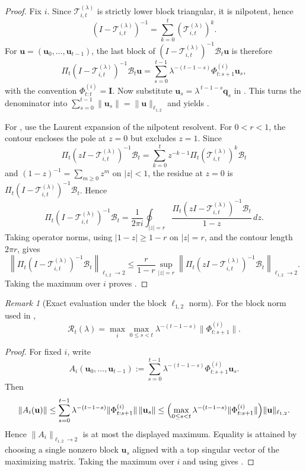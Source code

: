 \documentclass{article}
\theoremstyle{remark}
\newtheorem{remark}[theorem]{Remark}
\begin{document}
\begin{proof}
Fix $i$. Since $\mathcal{T}_{i,t}^{(\lambda)}$ is strictly lower block
triangular, it is nilpotent, hence
\[
  (I-\mathcal{T}_{i,t}^{(\lambda)})^{-1}
  = \sum_{k=0}^{t} (\mathcal{T}_{i,t}^{(\lambda)})^k.
\]
For $\mathbf{u}=(\mathbf{u}_0,\dots,\mathbf{u}_{t-1})$, the last block of
$(I-\mathcal{T}_{i,t}^{(\lambda)})^{-1}\mathcal{B}_t\mathbf{u}$ is therefore
\[
  \Pi_t (I-\mathcal{T}_{i,t}^{(\lambda)})^{-1}\mathcal{B}_t\mathbf{u}
  = \sum_{s=0}^{t-1}
    \lambda^{-(t-1-s)}\Phi_{t:s+1}^{(i)}\mathbf{u}_s,
\]
with the convention $\Phi_{t:t}^{(i)}=\mathbf{I}$.
Now substitute $\mathbf{u}_s = \lambda^{\,t-1-s}\mathbf{q}_s$ in
. This turns the denominator into
$\sum_{s=0}^{t-1}\|\mathbf{u}_s\| = \|\mathbf{u}\|_{\ell_{1,2}}$ and yields
.

For , use the Laurent expansion of the
nilpotent resolvent. For $0<r<1$, the contour encloses the pole at $z=0$ but
excludes $z=1$. Since
\[
  \Pi_t(zI-\mathcal{T}_{i,t}^{(\lambda)})^{-1}\mathcal{B}_t
  =
  \sum_{k=0}^{t} z^{-k-1}
  \Pi_t(\mathcal{T}_{i,t}^{(\lambda)})^k\mathcal{B}_t
\]
and $(1-z)^{-1}=\sum_{m\geq0}z^m$ on $|z|<1$, the residue at $z=0$ is
\(\Pi_t(I-\mathcal{T}_{i,t}^{(\lambda)})^{-1}\mathcal{B}_t\). Hence
\[
  \Pi_t(I-\mathcal{T}_{i,t}^{(\lambda)})^{-1}\mathcal{B}_t
  =
  \frac{1}{2\pi i}
  \oint_{|z|=r}
  \frac{\Pi_t(zI-\mathcal{T}_{i,t}^{(\lambda)})^{-1}\mathcal{B}_t}{1-z}\,dz.
\]
Taking operator norms, using $|1-z|\ge 1-r$ on $|z|=r$, and the contour length
$2\pi r$, gives
\[
  \left\|
    \Pi_t(I-\mathcal{T}_{i,t}^{(\lambda)})^{-1}\mathcal{B}_t
  \right\|_{\ell_{1,2}\to 2}
  \le
  \frac{r}{1-r}
  \sup_{|z|=r}
  \left\|
    \Pi_t(zI-\mathcal{T}_{i,t}^{(\lambda)})^{-1}\mathcal{B}_t
  \right\|_{\ell_{1,2}\to 2}.
\]
Taking the maximum over $i$ proves .
\end{proof}

\begin{remark}[Exact evaluation under the block $\ell_{1,2}$ norm]
\label{rem:cocycle_exact_eval}
For the block norm used in ,
\begin{equation}
  \mathcal{R}_t(\lambda)
  = \max_i \max_{0 \le s < t}
    \lambda^{-(t-1-s)}\|\Phi_{t:s+1}^{(i)}\|.
  \label{eq:cocycle_exact_eval}
\end{equation}
\end{remark}

\begin{proof}
For fixed $i$, write
\[
  A_i(\mathbf{u}_0,\dots,\mathbf{u}_{t-1})
  := \sum_{s=0}^{t-1}\lambda^{-(t-1-s)}\Phi_{t:s+1}^{(i)}\mathbf{u}_s.
\]
Then
\[
  \|A_i(\mathbf{u})\|
  \le \sum_{s=0}^{t-1}
      \lambda^{-(t-1-s)}\|\Phi_{t:s+1}^{(i)}\|\,\|\mathbf{u}_s\|
  \le
  \Bigl(\max_{0\le s<t}\lambda^{-(t-1-s)}\|\Phi_{t:s+1}^{(i)}\|\Bigr)
  \|\mathbf{u}\|_{\ell_{1,2}}.
\]
Hence $\|A_i\|_{\ell_{1,2}\to 2}$ is at most the displayed maximum. Equality is
attained by choosing a single nonzero block $\mathbf{u}_s$ aligned with a top
singular vector of the maximizing matrix. Taking the maximum over $i$ and using
 gives .
\end{proof}
\end{document}
